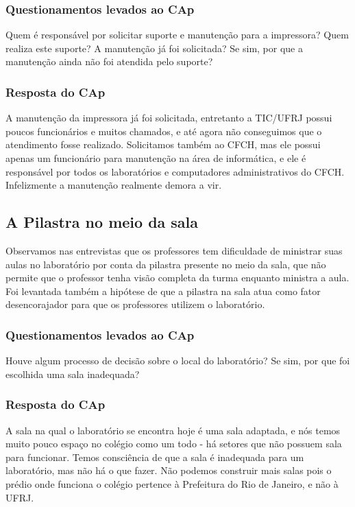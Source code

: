 \subsubsection{Questionamentos levados ao CAp}

Quem é responsável por solicitar suporte e manutenção para a impressora? Quem realiza este suporte? A manutenção já foi solicitada? Se sim, por que a manutenção ainda não foi atendida pelo suporte?

\subsubsection{Resposta do CAp}

A manutenção da impressora já foi solicitada, entretanto a TIC/UFRJ possui poucos funcionários e muitos chamados, e até agora não conseguimos que o atendimento fosse realizado. Solicitamos também ao CFCH, mas ele possui apenas um funcionário para manutenção na área de informática, e ele é responsável por todos os laboratórios e computadores administrativos do CFCH. Infelizmente a manutenção realmente demora a vir.

\subsection{A Pilastra no meio da sala}\label{sec:LABEL_CHP_REL_SEC_PROBS_SUBSEC_PIL}

Observamos nas entrevistas que os professores tem dificuldade de ministrar suas aulas no laboratório por conta da pilastra presente no meio da sala, que não permite que o professor tenha visão completa da turma enquanto ministra a aula. Foi levantada também a hipótese de que a pilastra na sala atua como fator desencorajador para que os professores utilizem o laboratório.

\subsubsection{Questionamentos levados ao CAp}

Houve algum processo de decisão sobre o local do laboratório? Se sim, por que foi escolhida uma sala inadequada?

\subsubsection{Resposta do CAp}

A sala na qual o laboratório se encontra hoje é uma sala adaptada, e nós temos muito pouco espaço no colégio como um todo - há setores que não possuem sala para funcionar. Temos consciência de que a sala é inadequada para um laboratório, mas não há o que fazer. Não podemos construir mais salas pois o prédio onde funciona o colégio pertence à Prefeitura do Rio de Janeiro, e não à UFRJ.


